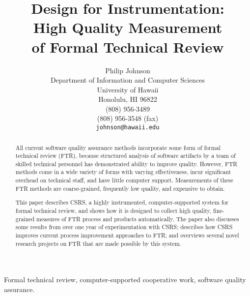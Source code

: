 
\title {{\bf Design for Instrumentation:\\
             High Quality Measurement\\
             of Formal Technical Review}}

\author{Philip Johnson\\
        Department of Information and Computer Sciences\\ 
        University of Hawaii\\ 
        Honolulu, HI 96822\\                       
       (808) 956-3489\\
       (808) 956-3548 (fax)\\
       {\tt johnson@hawaii.edu}}

\maketitle

 Formal technical review, computer-supported 
cooperative work, software quality assurance.

\begin{abstract}
  
  All current software quality assurance methods incorporate some form of
  formal technical review (FTR), because structured analysis of software
  artifacts by a team of skilled technical personnel has demonstrated
  ability to improve quality.  However, FTR methods come in a wide
  variety of forms with varying effectiveness, incur significant
  overhead on technical staff, and have little computer support.
  Measurements of these FTR methods are coarse-grained, frequently low
  quality, and expensive to obtain.
  
  This paper describes CSRS, a highly instrumented, computer-supported
  system for formal technical review, and shows how it is designed to
  collect high quality, fine-grained measures of FTR process and products
  automatically.  The paper also discusses some results from over one year
  of experimentation with CSRS; describes how CSRS improves current
  process improvement approaches to FTR; and overviews several novel
  research projects on FTR that are made possible by this system.
  
\end{abstract}




